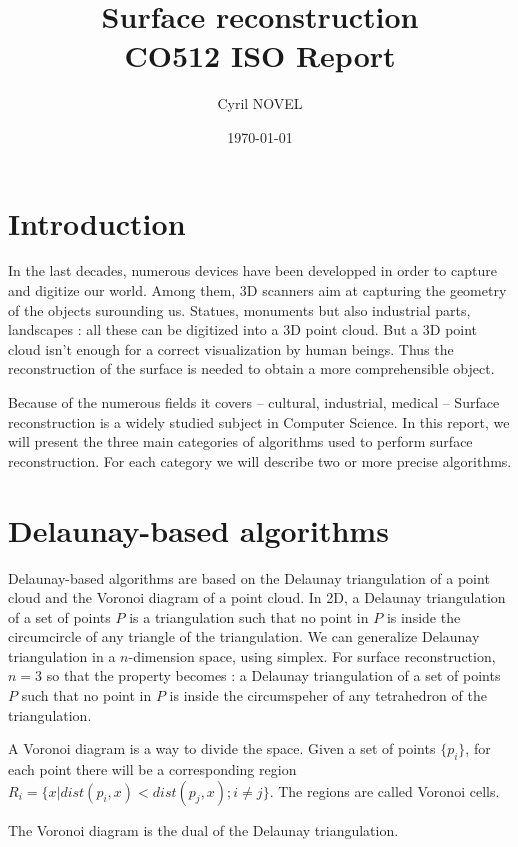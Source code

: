 \documentclass[12pt]{article}
\title{Surface reconstruction\\
\large{CO512 ISO Report}}
\author{Cyril NOVEL}
\date{\today}
\begin{document}
\maketitle
\newpage

\tableofcontents

\newpage

\section*{Introduction}
In the last decades, numerous devices have been developped in order to capture and digitize our world. Among them, 3D scanners aim at capturing the geometry of the objects surounding us. Statues, monuments but also industrial parts, landscapes : all these can be digitized into a 3D point cloud. But a 3D point cloud isn't enough for a correct visualization by human beings. Thus the reconstruction of the surface is needed to obtain a more comprehensible object.

Because of the numerous fields it covers -- cultural, industrial, medical -- Surface reconstruction is a widely studied subject in Computer Science. In this report, we will present the three main categories of algorithms used to perform surface reconstruction. For each category we will describe two or more precise algorithms.

\newpage

\section{Delaunay-based algorithms}
Delaunay-based algorithms are based on the Delaunay triangulation of a point cloud and the Voronoi diagram of a point cloud. In 2D, a Delaunay triangulation of a set of points $P$ is a triangulation such that no point in $P$ is inside the circumcircle of any triangle of the triangulation. We can generalize Delaunay triangulation in a $n$-dimension space, using simplex. For surface reconstruction, $n = 3$ so that the property becomes : a Delaunay triangulation of a set of points $P$ such that no point in $P$ is inside the circumspeher of any tetrahedron of the triangulation.

A Voronoi diagram is a way to divide the space. Given a set of points $\{p_i\}$,  for each point there will be a corresponding region $R_i = \{x | dist(p_i,x) < dist(p_j,x) ; i \ne j\}$. The regions are called Voronoi cells.

The Voronoi diagram is the dual of the Delaunay triangulation.
\end{document}
